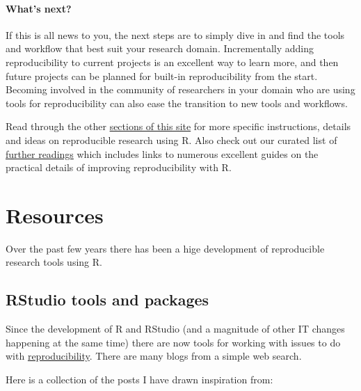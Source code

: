 \documentclass[
]{book}
\begin{document}
\hypertarget{whats-next}{%
\subsubsection{What's next?}\label{whats-next}}

If this is all news to you, the next steps are to simply dive in and find the tools and workflow that best suit your research domain. Incrementally adding reproducibility to current projects is an excellent way to learn more, and then future projects can be planned for built-in reproducibility from the start. Becoming involved in the community of researchers in your domain who are using tools for reproducibility can also ease the transition to new tools and workflows.

Read through the other \href{http://ropensci.github.io/reproducibility-guide/}{sections of this site} for more specific instructions, details and ideas on reproducible research using R. Also check out our curated list of \href{http://ropensci.github.io/reproducibility-guide/sections/references/}{further readings} which includes links to numerous excellent guides on the practical details of improving reproducibility with R.

\hypertarget{resources}{%
\chapter{Resources}\label{resources}}

Over the past few years there has been a hige development of reproducible research tools using R.

\hypertarget{rstudio-tools-and-packages}{%
\section{RStudio tools and packages}\label{rstudio-tools-and-packages}}

Since the development of R and RStudio (and a magnitude of other IT changes happening at the same time) there are now tools for working with issues to do with \href{https://www.nature.com/news/1-500-scientists-lift-the-lid-on-reproducibility-1.19970}{reproducibility}. There are many blogs from a simple web search.

Here is a collection of the posts I have drawn inspiration from:
\end{document}

